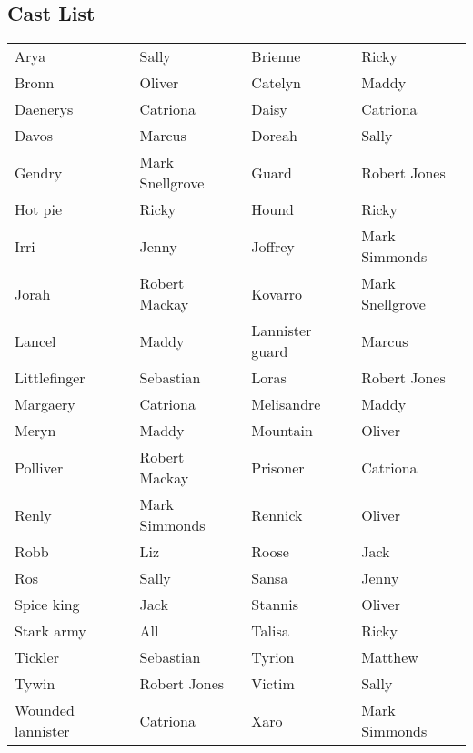 \subsection*{Cast List}
\begin{tabular}{ll|ll}\\
Arya & Sally &  Brienne & Ricky\\
Bronn & Oliver &  Catelyn & Maddy\\
Daenerys & Catriona &  Daisy & Catriona\\
Davos & Marcus &  Doreah & Sally\\
Gendry & Mark Snellgrove &  Guard & Robert Jones\\
Hot pie & Ricky &  Hound & Ricky\\
Irri & Jenny &  Joffrey & Mark Simmonds\\
Jorah & Robert Mackay &  Kovarro & Mark Snellgrove\\
Lancel & Maddy &  Lannister guard & Marcus\\
Littlefinger & Sebastian &  Loras & Robert Jones\\
Margaery & Catriona &  Melisandre & Maddy\\
Meryn & Maddy &  Mountain & Oliver\\
Polliver & Robert Mackay &  Prisoner & Catriona\\
Renly & Mark Simmonds &  Rennick & Oliver\\
Robb & Liz &  Roose & Jack\\
Ros & Sally &  Sansa & Jenny\\
Spice king & Jack &  Stannis & Oliver\\
Stark army & All &  Talisa & Ricky\\
Tickler & Sebastian &  Tyrion & Matthew\\
Tywin & Robert Jones &  Victim & Sally\\
Wounded lannister & Catriona &  Xaro & Mark Simmonds\\
\end{tabular}
